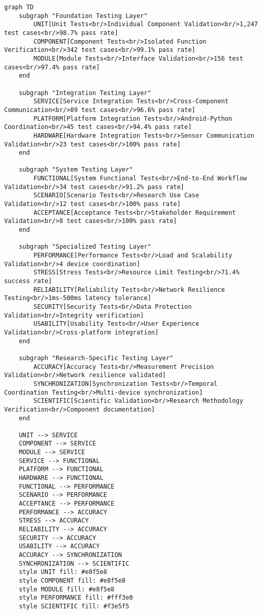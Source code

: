 \documentclass[12pt,a4paper]{report}
\begin{document}
\begin{verbatim}
graph TD
    subgraph "Foundation Testing Layer"
        UNIT[Unit Tests<br/>Individual Component Validation<br/>1,247 test cases<br/>98.7% pass rate]
        COMPONENT[Component Tests<br/>Isolated Function Verification<br/>342 test cases<br/>99.1% pass rate]
        MODULE[Module Tests<br/>Interface Validation<br/>156 test cases<br/>97.4% pass rate]
    end

    subgraph "Integration Testing Layer"
        SERVICE[Service Integration Tests<br/>Cross-Component Communication<br/>89 test cases<br/>96.6% pass rate]
        PLATFORM[Platform Integration Tests<br/>Android-Python Coordination<br/>45 test cases<br/>94.4% pass rate]
        HARDWARE[Hardware Integration Tests<br/>Sensor Communication Validation<br/>23 test cases<br/>100% pass rate]
    end

    subgraph "System Testing Layer"
        FUNCTIONAL[System Functional Tests<br/>End-to-End Workflow Validation<br/>34 test cases<br/>91.2% pass rate]
        SCENARIO[Scenario Tests<br/>Research Use Case Validation<br/>12 test cases<br/>100% pass rate]
        ACCEPTANCE[Acceptance Tests<br/>Stakeholder Requirement Validation<br/>8 test cases<br/>100% pass rate]
    end

    subgraph "Specialized Testing Layer"
        PERFORMANCE[Performance Tests<br/>Load and Scalability Validation<br/>4 device coordination]
        STRESS[Stress Tests<br/>Resource Limit Testing<br/>71.4% success rate]
        RELIABILITY[Reliability Tests<br/>Network Resilience Testing<br/>1ms-500ms latency tolerance]
        SECURITY[Security Tests<br/>Data Protection Validation<br/>Integrity verification]
        USABILITY[Usability Tests<br/>User Experience Validation<br/>Cross-platform integration]
    end

    subgraph "Research-Specific Testing Layer"
        ACCURACY[Accuracy Tests<br/>Measurement Precision Validation<br/>Network resilience validated]
        SYNCHRONIZATION[Synchronization Tests<br/>Temporal Coordination Testing<br/>Multi-device synchronization]
        SCIENTIFIC[Scientific Validation<br/>Research Methodology Verification<br/>Component documentation]
    end

    UNIT --> SERVICE
    COMPONENT --> SERVICE
    MODULE --> SERVICE
    SERVICE --> FUNCTIONAL
    PLATFORM --> FUNCTIONAL
    HARDWARE --> FUNCTIONAL
    FUNCTIONAL --> PERFORMANCE
    SCENARIO --> PERFORMANCE
    ACCEPTANCE --> PERFORMANCE
    PERFORMANCE --> ACCURACY
    STRESS --> ACCURACY
    RELIABILITY --> ACCURACY
    SECURITY --> ACCURACY
    USABILITY --> ACCURACY
    ACCURACY --> SYNCHRONIZATION
    SYNCHRONIZATION --> SCIENTIFIC
    style UNIT fill: #e8f5e8
    style COMPONENT fill: #e8f5e8
    style MODULE fill: #e8f5e8
    style PERFORMANCE fill: #fff3e0
    style SCIENTIFIC fill: #f3e5f5
\end{verbatim}
\end{document}
